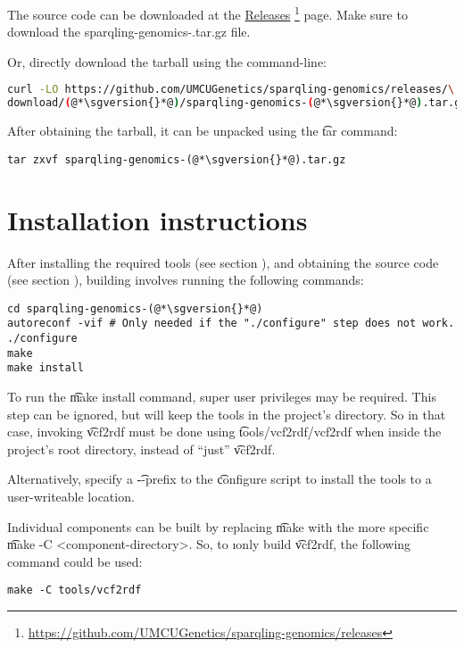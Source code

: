   \begin{sloppypar}
  The source code can be downloaded at the
  \href{https://github.com/UMCUGenetics/sparqling-genomics/releases}%
  {Releases}%
  \footnote{\url{https://github.com/UMCUGenetics/sparqling-genomics/releases}}
  page.  Make sure to download the {\fontfamily{\ttdefault}\selectfont
    sparqling-genomics-\sgversion{}.tar.gz} file.
  \end{sloppypar}

  Or, directly download the tarball using the command-line:
\begin{siderules}
\begin{lstlisting}[language=bash]
curl -LO https://github.com/UMCUGenetics/sparqling-genomics/releases/\
download/(@*\sgversion{}*@)/sparqling-genomics-(@*\sgversion{}*@).tar.gz
\end{lstlisting}
\end{siderules}

  After obtaining the tarball, it can be unpacked using the \t{tar}
  command:

\begin{siderules}
\begin{lstlisting}
tar zxvf sparqling-genomics-(@*\sgversion{}*@).tar.gz
\end{lstlisting}
\end{siderules}

\section{Installation instructions}

  After installing the required tools (see section ),
  and obtaining the source code (see section \refer{sec:obtaining-tarball}),
  building involves running the following commands:

\begin{siderules}
\begin{lstlisting}
cd sparqling-genomics-(@*\sgversion{}*@)
autoreconf -vif # Only needed if the "./configure" step does not work.
./configure
make
make install
\end{lstlisting}
\end{siderules}

  To run the \t{make install} command, super user privileges may be
  required.  This step can be ignored, but will keep the tools in the project's
  directory.  So in that case, invoking \t{vcf2rdf} must be done using
  \t{tools/vcf2rdf/vcf2rdf} when inside the project's root directory,
  instead of ``just'' \t{vcf2rdf}.

  Alternatively, specify a \t{-{}-prefix} to the \t{configure}
  script to install the tools to a user-writeable location.

  Individual components can be built by replacing \t{make} with the
  more specific \t{make -C <component-directory>}.  So, to \i{only}
  build \t{vcf2rdf}, the following command could be used:

\begin{siderules}
\begin{verbatim}
make -C tools/vcf2rdf
\end{verbatim}
\end{siderules}
